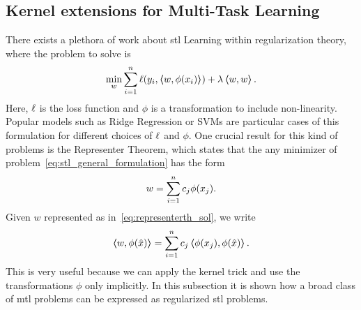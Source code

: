 \subsection{Kernel extensions for Multi-Task Learning} \label{subsec:kernels_mtl}
There exists a plethora of work about \acrshort{stl} Learning within regularization theory, where the problem to solve is
\begin{equation}
    \label{eq:stl_general_formulation}
    \begin{aligned}
        \min_{w} & \sum_{i=1}^{\nsamples} \lossf(y_i, \dotp{w}{\phi(x_i)}) + \lambda \dotp{w}{w} . \\
    \end{aligned}
\end{equation}
Here, $\ell$ is the loss function and $\phi$ is a transformation to include non-linearity. Popular models such as Ridge Regression or SVMs are particular cases of this formulation for different choices of $\ell$ and $\phi$.
One crucial result for this kind of problems is the {Representer Theorem}, which states that the any minimizer of problem~\eqref{eq:stl_general_formulation} has the form
\begin{equation}
    \label{eq:representerth_sol}
    w = \sum_{i=1}^\nsamples c_j \phi(x_j) .
\end{equation}
Given $w$ represented as in~\eqref{eq:representerth_sol}, we write
\begin{equation}
    \nonumber
    \bm{\left\langle} w, \phi(\hat{x}) \bm{\right\rangle} = \sum_{i=1}^n c_j \bm{\left\langle} \phi(x_j), \phi(\hat{x}) \bm{\right\rangle}.
\end{equation}
This is very useful because we can apply the kernel trick and use the transformations $\phi$ only implicitly.
In this subsection it is shown how a broad class of \acrshort{mtl} problems can be expressed as regularized \acrfull{stl} problems.

